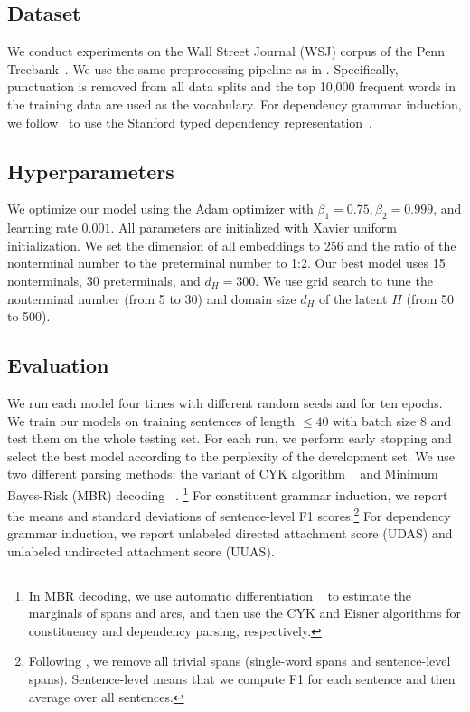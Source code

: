 \documentclass[11pt,a4paper]{article}
\begin{document}
\subsection{Dataset}
We conduct experiments  on the Wall Street Journal (WSJ) corpus of the Penn Treebank~\citep{marcus-etal-1994-penn}.
We use the same preprocessing pipeline as in \citet{kim-etal-2019-compound}.
Specifically, punctuation is removed from all data splits
and the top 10,000 frequent words in the training data are used as the vocabulary. 
For dependency grammar induction,
we follow~\cite{zhu-etal-2020-return} to use the Stanford typed dependency representation~\citep{de-marneffe-manning-2008-stanford}.






\subsection{Hyperparameters}
We optimize our model using the Adam optimizer with $\beta_1 = 0.75, \beta_2 = 0.999$, and learning rate $0.001$.
All parameters are initialized with Xavier uniform initialization. We set the dimension of all embeddings to 256 and the ratio of the nonterminal number to the preterminal number to 1:2. Our best model uses 15 nonterminals, 30 preterminals, and $d_H = 300$.
We use grid search to tune the nonterminal number (from 5 to 30) and domain size $d_H$ of the latent $H$ (from 50 to 500).

\subsection{Evaluation}
We run each model four times with different random seeds and for ten epochs. We train our models on training sentences of length $\le 40$ with batch size 8 and test them on the whole testing set. 
For each run, we perform early stopping and select the best model according to the perplexity of the development set. We use two different parsing methods: the variant of CYK algorithm ~\cite{eisner-satta-1999-efficient} and Minimum Bayes-Risk (MBR) decoding ~\cite{smith-eisner-2006-minimum}. \footnote{In MBR decoding, we use automatic differentiation ~\citep{eisner-2016-inside, rush-2020-torch} to estimate the marginals of spans and arcs, and then use the CYK and Eisner algorithms for constituency and dependency parsing, respectively.} For constituent grammar induction, we report the means and standard deviations of sentence-level F1 scores.\footnote{Following \citet{kim-etal-2019-compound}, we remove all trivial spans (single-word spans and sentence-level spans). Sentence-level means that we compute F1 for each sentence and then average over all sentences.} For dependency grammar induction, we report unlabeled directed attachment score (UDAS) and unlabeled undirected attachment score (UUAS). 
\end{document}
